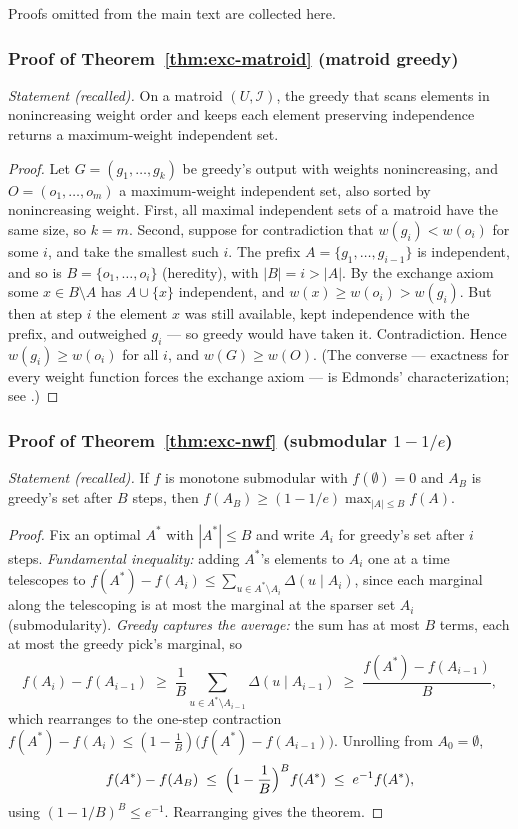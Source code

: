 Proofs omitted from the main text are collected here.

\subsubsection*{Proof of Theorem~\ref{thm:exc-matroid} (matroid greedy)}
{\itshape Statement (recalled).} On a matroid $(U,\mathcal{I})$, the greedy that scans
elements in nonincreasing weight order and keeps each element preserving independence
returns a maximum-weight independent set.\eop

\begin{proof}
Let $G = (g_1,\dots,g_k)$ be greedy's output with weights nonincreasing, and
$O = (o_1,\dots,o_m)$ a maximum-weight independent set, also sorted by nonincreasing
weight. First, all maximal independent sets of a matroid have the same size, so
$k=m$. Second, suppose for contradiction that $w(g_i) < w(o_i)$ for some $i$, and take
the smallest such $i$. The prefix $A = \{g_1,\dots,g_{i-1}\}$ is independent, and so
is $B = \{o_1,\dots,o_i\}$ (heredity), with $|B| = i > |A|$. By the exchange axiom
some $x\in B\setminus A$ has $A\cup\{x\}$ independent, and
$w(x)\ge w(o_i) > w(g_i)$. But then at step $i$ the element $x$ was still available,
kept independence with the prefix, and outweighed $g_i$ --- so greedy would have taken
it. Contradiction. Hence $w(g_i)\ge w(o_i)$ for all $i$, and $w(G)\ge w(O)$. (The
converse --- exactness for every weight function forces the exchange axiom --- is
Edmonds' characterization; see \citep{exchange-greedy-bg1}.)
\end{proof}

\subsubsection*{Proof of Theorem~\ref{thm:exc-nwf} (submodular $1-1/e$)}
{\itshape Statement (recalled).} If $f$ is monotone submodular with $f(\emptyset)=0$
and $A_B$ is greedy's set after $B$ steps, then
$f(A_B)\ge (1-1/e)\max_{|A|\le B}f(A)$.\eop

\begin{proof}
Fix an optimal $A^{*}$ with $|A^{*}|\le B$ and write $A_i$ for greedy's set after $i$
steps. \emph{Fundamental inequality:} adding $A^{*}$'s elements to $A_i$ one at a time
telescopes to $f(A^{*}) - f(A_i) \le \sum_{u\in A^{*}\setminus A_i}
\Delta(u\mid A_i)$, since each marginal along the telescoping is at most the marginal
at the sparser set $A_i$ (submodularity). \emph{Greedy captures the average:} the sum
has at most $B$ terms, each at most the greedy pick's marginal, so
\[
f(A_i) - f(A_{i-1}) \;\ge\; \frac{1}{B}\sum_{u\in A^{*}\setminus A_{i-1}}
\Delta(u\mid A_{i-1}) \;\ge\; \frac{f(A^{*}) - f(A_{i-1})}{B},
\]
which rearranges to the one-step contraction
$f(A^{*})-f(A_i) \le (1-\tfrac1B)\bigl(f(A^{*})-f(A_{i-1})\bigr)$. Unrolling from
$A_0=\emptyset$,
\[
f(A^{*}) - f(A_B) \;\le\; \Bigl(1-\frac1B\Bigr)^{B} f(A^{*}) \;\le\; e^{-1}f(A^{*}),
\]
using $(1-1/B)^{B}\le e^{-1}$. Rearranging gives the theorem.
\end{proof}


